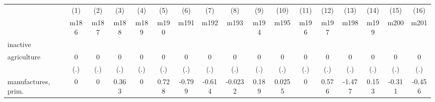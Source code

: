 {
\def\sym#1{\ifmmode^{#1}\else\(^{#1}\)\fi}
\begin{tabular}{l*{16}{c}}
\hline\hline
                    &\multicolumn{1}{c}{(1)}&\multicolumn{1}{c}{(2)}&\multicolumn{1}{c}{(3)}&\multicolumn{1}{c}{(4)}&\multicolumn{1}{c}{(5)}&\multicolumn{1}{c}{(6)}&\multicolumn{1}{c}{(7)}&\multicolumn{1}{c}{(8)}&\multicolumn{1}{c}{(9)}&\multicolumn{1}{c}{(10)}&\multicolumn{1}{c}{(11)}&\multicolumn{1}{c}{(12)}&\multicolumn{1}{c}{(13)}&\multicolumn{1}{c}{(14)}&\multicolumn{1}{c}{(15)}&\multicolumn{1}{c}{(16)}\\
                    &\multicolumn{1}{c}{m186}&\multicolumn{1}{c}{m187}&\multicolumn{1}{c}{m188}&\multicolumn{1}{c}{m189}&\multicolumn{1}{c}{m190}&\multicolumn{1}{c}{m191}&\multicolumn{1}{c}{m192}&\multicolumn{1}{c}{m193}&\multicolumn{1}{c}{m194}&\multicolumn{1}{c}{m195}&\multicolumn{1}{c}{m196}&\multicolumn{1}{c}{m197}&\multicolumn{1}{c}{m198}&\multicolumn{1}{c}{m199}&\multicolumn{1}{c}{m200}&\multicolumn{1}{c}{m201}\\
\hline
inactive            &                     &                     &                     &                     &                     &                     &                     &                     &                     &                     &                     &                     &                     &                     &                     &                     \\
agriculture         &           0         &           0         &           0         &           0         &           0         &           0         &           0         &           0         &           0         &           0         &           0         &           0         &           0         &           0         &           0         &           0         \\
                    &         (.)         &         (.)         &         (.)         &         (.)         &         (.)         &         (.)         &         (.)         &         (.)         &         (.)         &         (.)         &         (.)         &         (.)         &         (.)         &         (.)         &         (.)         &         (.)         \\
[1em]
manufactures, prim. &           0         &           0         &       0.363         &           0         &       0.728         &      -0.799         &      -0.614         &     -0.0232         &       0.189         &      0.0255         &           0         &       0.576         &      -1.477         &       0.153         &      -0.311         &      -0.456         \\

\end{tabular}}
